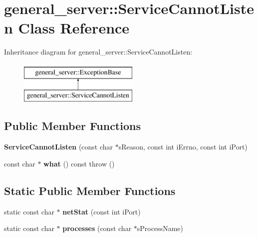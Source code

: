 \hypertarget{classgeneral__server_1_1ServiceCannotListen}{\section{general\-\_\-server\-:\-:\-Service\-Cannot\-Listen \-Class \-Reference}
\label{classgeneral__server_1_1ServiceCannotListen}
}
\-Inheritance diagram for general\-\_\-server\-:\-:\-Service\-Cannot\-Listen\-:\begin{figure}[H]
\begin{center}
\leavevmode
\includegraphics[height=2.000000cm]{classgeneral__server_1_1ServiceCannotListen}
\end{center}
\end{figure}
\subsection*{\-Public \-Member \-Functions}
\begin{DoxyCompactItemize}
\item 
\hypertarget{classgeneral__server_1_1ServiceCannotListen_a077fe1350316905336b1e1ec10fc19a0}{{\bfseries \-Service\-Cannot\-Listen} (const char $\ast$s\-Reason, const int i\-Errno, const int i\-Port)}\label{classgeneral__server_1_1ServiceCannotListen_a077fe1350316905336b1e1ec10fc19a0}

\item 
\hypertarget{classgeneral__server_1_1ServiceCannotListen_a8db7d4b3a00c91c7ffe2b5799baefd7e}{const char $\ast$ {\bfseries what} () const   throw ()}\label{classgeneral__server_1_1ServiceCannotListen_a8db7d4b3a00c91c7ffe2b5799baefd7e}

\end{DoxyCompactItemize}
\subsection*{\-Static \-Public \-Member \-Functions}
\begin{DoxyCompactItemize}
\item 
\hypertarget{classgeneral__server_1_1ServiceCannotListen_ac30fad95ad08f421542cb8d8a2cb95f5}{static const char $\ast$ {\bfseries net\-Stat} (const int i\-Port)}\label{classgeneral__server_1_1ServiceCannotListen_ac30fad95ad08f421542cb8d8a2cb95f5}

\item 
\hypertarget{classgeneral__server_1_1ServiceCannotListen_acac4ef5941db1e75670ecffad458ea84}{static const char $\ast$ {\bfseries processes} (const char $\ast$s\-Process\-Name)}\label{classgeneral__server_1_1ServiceCannotListen_acac4ef5941db1e75670ecffad458ea84}

\end{DoxyCompactItemize}
